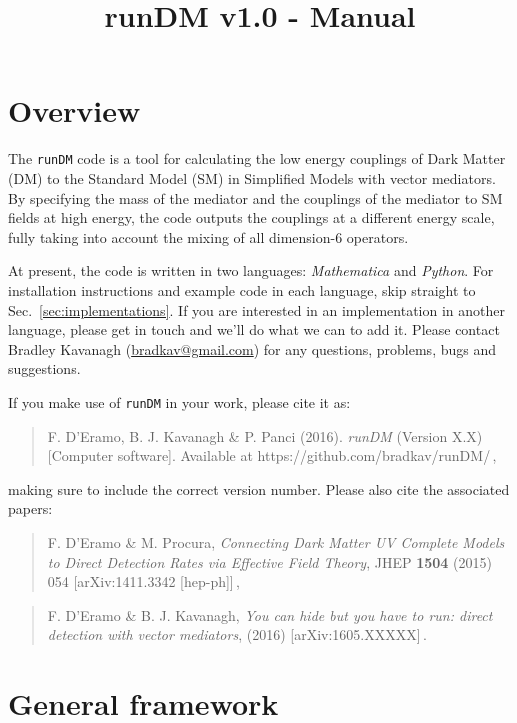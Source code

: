 \documentclass[notitlepage,12pt]{article}
\newcommand{\runDM}{\texttt{runDM}\xspace}
\begin{document}
\title{runDM v1.0 - Manual}
\maketitle


\section{Overview}

The \runDM code is a tool for calculating the low energy couplings of Dark Matter (DM) to the Standard Model (SM) in Simplified Models with vector mediators. By specifying the mass of the mediator and the couplings of the mediator to SM fields at high energy, the code outputs the couplings at a different energy scale, fully taking into account the mixing of all dimension-6 operators.

At present, the code is written in two languages: \textit{Mathematica} and \textit{Python}. For installation instructions and example code in each language, skip straight to Sec.~\ref{sec:implementations}. If you are interested in an implementation in another language, please get in touch and we'll do what we can to add it. Please contact Bradley Kavanagh (\href{mailto:bradkav@gmail.com?subject=runDM v.10}{bradkav@gmail.com}) for any questions, problems, bugs and suggestions.

If you make use of \runDM in your work, please cite it as:

\begin{quote}
F. D'Eramo, B. J. Kavanagh \& P. Panci (2016). \textit{runDM} (Version X.X) [Computer software]. Available at https://github.com/bradkav/runDM/\,,
\end{quote}
making sure to include the correct version number. Please also cite the associated papers:

\begin{quote}
F. D'Eramo \& M. Procura, \textit{Connecting Dark Matter UV Complete Models to Direct Detection Rates via Effective Field Theory}, JHEP {\bf 1504} (2015) 054 [arXiv:1411.3342 [hep-ph]]\,,
\end{quote}

\begin{quote}
F. D'Eramo \& B. J. Kavanagh, \textit{You can hide but you have to run: direct detection with vector mediators}, (2016) [arXiv:1605.XXXXX]\,.
\end{quote}


\section{General framework}
\end{document}
